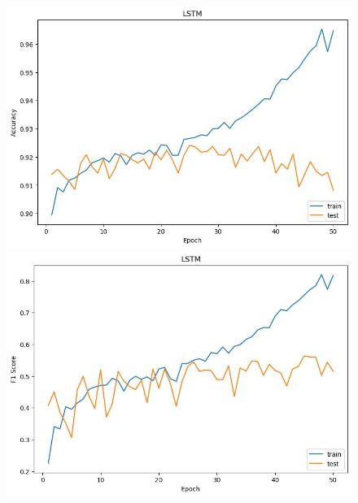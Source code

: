 \documentclass[UTF8]{article}
\begin{document}
\begin{figure}[h]
    \centering
    \begin{minipage}{.43\linewidth}
        \centering
        \includegraphics[width=\linewidth]{../figure/LSTM_Accuracy.jpg}
    \end{minipage}
    \begin{minipage}{.43\linewidth}
        \centering
        \includegraphics[width=\linewidth]{../figure/LSTM_F1.jpg}
    \end{minipage}


\end{figure}
\end{document}
